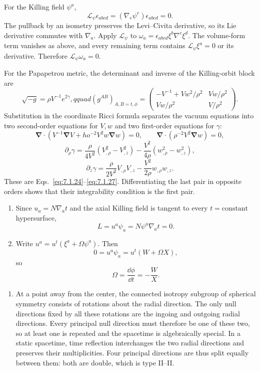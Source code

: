 \ExerciseEditorialNote

\begin{enumerate}[leftmargin=2.8em,itemsep=1.2em]
For the Killing field \(\psi^a\),
\[
 \mathcal L_\psi\epsilon_{abcd}=(\nabla_e\psi^e)\epsilon_{abcd}=0.
\]
The pullback by an isometry preserves the Levi--Civita derivative, so its Lie
derivative commutes with \(\nabla_a\).  Apply \(\mathcal L_\psi\) to
\(\omega_a=\epsilon_{abcd}\xi^b\nabla^c\xi^d\).  The volume-form term
vanishes as above, and every remaining term contains
\(\mathcal L_\psi\xi^a=0\) or its derivative.  Therefore
\(\mathcal L_\psi\omega_a=0\).

For the Papapetrou metric, the determinant and inverse of the Killing-orbit
block are
\[
 \sqrt{-g}=\rho V^{-1}e^{2\gamma},qquad
 (g^{AB})_{A,B=t,\phi}
 =\begin{pmatrix}
 -V^{-1}+Vw^2/\rho^2&Vw/\rho^2\\
 Vw/\rho^2&V/\rho^2
 \end{pmatrix}.
\]
Substitution in the coordinate Ricci formula separates the vacuum equations
into two second-order equations for \(V,w\) and two first-order equations for
\(\gamma\):
\[
 \boldsymbol\nabla\mathbin\cdot
 \left(V^{-1}\boldsymbol\nabla V+
ho^{-2}V^2w\boldsymbol\nabla w\right)=0,
 \qquad
 \boldsymbol\nabla\mathbin\cdot
 \left(\rho^{-2}V^2\boldsymbol\nabla w\right)=0,
\]
\[
 \partial_\rho\gamma
 =\frac{\rho}{4V^2}(V_{,\rho}^2-V_{,z}^2)
 -\frac{V^2}{4\rho}(w_{,\rho}^2-w_{,z}^2),
\]
\[
 \partial_z\gamma
 =\frac{\rho}{2V^2}V_{,\rho}V_{,z}
 -\frac{V^2}{2\rho}w_{,\rho}w_{,z}.
\]
These are Eqs.~\eqref{eq:7.1.24}--\eqref{eq:7.1.27}.  Differentiating the
last pair in opposite orders shows that their integrability condition is the
first pair.

\begin{enumerate}[label=\alph*),leftmargin=2em]
\item Since \(u_a=N\nabla_at\) and the axial Killing field is tangent to every
\(t=\text{constant}\) hypersurface,
\[
 L=u^a\psi_a=N\psi^a\nabla_at=0.
\]

\item Write \(u^a=u^t(\xi^a+\Omega\psi^a)\).  Then
\[
 0=u^a\psi_a=u^t(W+\Omega X),
\]
so
\[
 \Omega=\frac{\dd\phi}{\dd t}=-\frac{W}{X}.
\]
\end{enumerate}

\begin{enumerate}[label=\alph*),leftmargin=2em]
\item At a point away from the center, the connected isotropy subgroup of
spherical symmetry consists of rotations about the radial direction.  The
only null directions fixed by all these rotations are the ingoing and
outgoing radial directions.  Every principal null direction must therefore
be one of these two, so at least one is repeated and the spacetime is
algebraically special.  In a static spacetime, time reflection interchanges
the two radial directions and preserves their multiplicities.  Four
principal directions are thus split equally between them: both are double,
which is type II--II.


\end{enumerate}
\end{enumerate}
